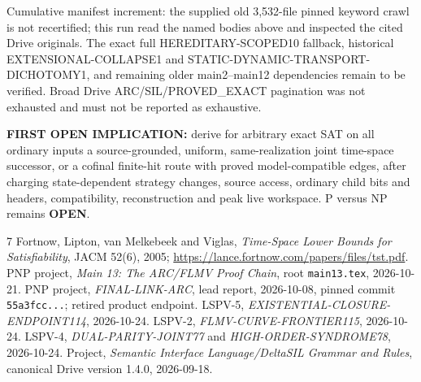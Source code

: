 \documentclass[11pt]{article}
\begin{document}
Cumulative manifest increment: the supplied old 3,532-file pinned keyword crawl is not recertified; this run read the named bodies above and inspected the cited Drive originals. The exact full HEREDITARY-SCOPED10 fallback, historical EXTENSIONAL-COLLAPSE1 and STATIC-DYNAMIC-TRANSPORT-DICHOTOMY1, and remaining older main2--main12 dependencies remain to be verified. Broad Drive ARC/SIL/PROVED\_EXACT pagination was not exhausted and must not be reported as exhaustive.

\textbf{FIRST OPEN IMPLICATION:} derive for arbitrary exact SAT on all ordinary inputs a source-grounded, uniform, same-realization joint time-space successor, or a cofinal finite-hit route with proved model-compatible edges, after charging state-dependent strategy changes, source access, ordinary child bits and headers, compatibility, reconstruction and peak live workspace. P versus NP remains \textbf{OPEN}.

\begin{thebibliography}{7}
 Fortnow, Lipton, van Melkebeek and Viglas, \emph{Time-Space Lower Bounds for Satisfiability}, JACM 52(6), 2005; \url{https://lance.fortnow.com/papers/files/tst.pdf}.
 PNP project, \emph{Main 13: The ARC/FLMV Proof Chain}, root \texttt{main13.tex}, 2026-10-21.
 PNP project, \emph{FINAL-LINK-ARC}, lead report, 2026-10-08, pinned commit \texttt{55a3fcc...}; retired product endpoint.
 LSPV-5, \emph{EXISTENTIAL-CLOSURE-ENDPOINT114}, 2026-10-24.
 LSPV-2, \emph{FLMV-CURVE-FRONTIER115}, 2026-10-24.
 LSPV-4, \emph{DUAL-PARITY-JOINT77} and \emph{HIGH-ORDER-SYNDROME78}, 2026-10-24.
 Project, \emph{Semantic Interface Language/DeltaSIL Grammar and Rules}, canonical Drive version 1.4.0, 2026-09-18.
\end{thebibliography}
\end{document}
